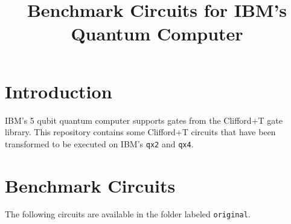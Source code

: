 \documentclass{article}
\begin{document}
\title{Benchmark Circuits for IBM's Quantum Computer}
\date{}
\maketitle

\section{Introduction}
IBM's 5 qubit quantum computer \cite{IBMQ} supports gates from the Clifford+T gate library. 
This repository contains some  Clifford+T circuits that have been transformed to be executed on IBM's {\tt qx2} and {\tt qx4}.

\section{Benchmark Circuits}

The following circuits are available in the folder labeled {\tt original}.
\vspace{5mm}
\end{document}
